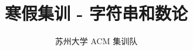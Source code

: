 \documentclass[lang=cn]{elegantpaper}
\title{寒假集训 - 字符串和数论}
\author{苏州大学 ACM 集训队}
\begin{document}
\isBeamerMode\relax
    \maketitle
    \tableofcontents
    \newpage
\fi

\isBeamerMode\relax
    \frame{\titlepage}
\fi



\def\TOCName{字符串基础} 
\def\TOCName{字典树} 
\def\TOCName{位运算} 
\def\TOCName{模运算} 
\def\TOCName{快速幂} 
\def\TOCName{BSGS} 



\isBeamerMode\relax
\fi
\end{document}
